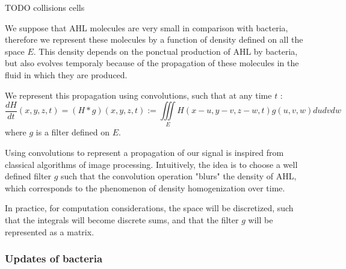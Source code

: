 \documentclass[a4paper]{article}
\theoremstyle{definition}
\begin{document}
TODO collisions cells

We suppose that AHL molecules are very small in comparison with bacteria, therefore we represent these molecules by a function of density defined on all the space $E$. This density depends on the ponctual production of AHL by bacteria, but also evolves temporaly because of the propagation of these molecules in the fluid in which they are produced.

We represent this propagation using convolutions, such that at any time $t$ :
\begin{equation}
\frac{dH}{dt}(x,y,z,t) = (H * g)(x,y,z,t) := \iiint \limits_E H(x-u,y-v,z-w,t)g(u,v,w) du dv dw
\end{equation}
where $g$ is a filter defined on $E$.

Using convolutions to represent a propagation of our signal is inspired from classical algorithms of image processing. Intuitively, the idea is to choose a well defined filter $g$ such that the convolution operation "blurs" the density of AHL, which corresponds to the phenomenon of density homogenization over time.

In practice, for computation considerations, the space will be discretized, such that the integrals will become discrete sums, and that the filter $g$ will be represented as a matrix.



\subsubsection{Updates of bacteria}
\end{document}
